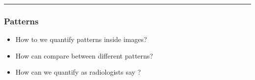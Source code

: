 \documentclass[letterpaper,10pt,english]{sphinxmanual}
\begin{document}
\bigskip\hrule\bigskip



\subsubsection{Patterns}
\label{\detokenize{06-AdvancedShapeAndTexture:patterns}}\begin{itemize}
\item {} 
\sphinxAtStartPar
How to we quantify patterns inside images?

\item {} 
\sphinxAtStartPar
How can compare between different patterns?

\item {} 
\sphinxAtStartPar
How can we quantify as radiologists say ?

\end{itemize}
\end{document}

